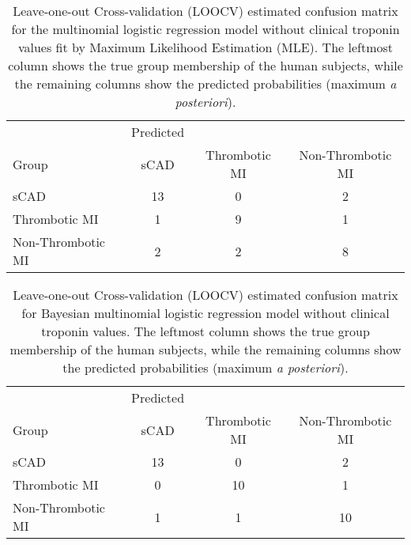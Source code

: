 \begin{DoubleSpace*}
\begin{table}[H]
 	\caption[Leave-one-out Cross-validation (LOOCV) estimated confusion matrix for the multinomial logistic regression model without clinical troponin values fit by Maximum Likelihood Estimation]{\DoubleSpacing Leave-one-out Cross-validation (LOOCV) estimated confusion matrix for the multinomial logistic regression model without clinical troponin values fit by Maximum Likelihood Estimation (MLE). The leftmost column shows the true group membership of the human subjects, while the remaining columns show the predicted probabilities (maximum \emph{a posteriori}).}
\label{tab:modelRes0}
\begin{tabular}{l|ccc}
& Predicted & & \\
Group  &     sCAD & Thrombotic MI & Non-Thrombotic MI \\
\hline
sCAD & 13 &  0 & 2\\
Thrombotic MI &   1 & 9 &  1\\
Non-Thrombotic MI  & 2  & 2 & 8 
\end{tabular}
\end{table}

 \begin{table}[H]
\centering
\caption[Leave-one-out Cross-validation (LOOCV) estimated confusion matrix for Bayesian multinomial logistic regression model without clinical troponin values]{\DoubleSpacing Leave-one-out Cross-validation (LOOCV) estimated confusion matrix for Bayesian multinomial logistic regression model without clinical troponin values. The leftmost column shows the true group membership of the human subjects, while the remaining columns show the predicted probabilities (maximum \emph{a posteriori}).}
\label{tab:modelRes}
\begin{tabular}{l|ccc}
& Predicted & & \\
Group  &     sCAD & Thrombotic MI & Non-Thrombotic MI \\
\hline
sCAD   &     13    &     0    &     2\\
Thrombotic MI  &  0    &    10    &     1\\
Non-Thrombotic MI &   1    &     1   &     10
\end{tabular}
 \end{table}
 

\end{DoubleSpace*}
